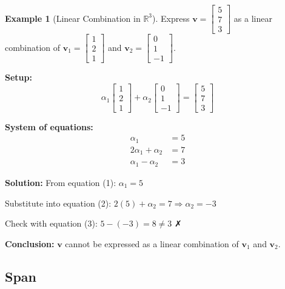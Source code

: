 \documentclass[12pt,a4paper]{article}
\theoremstyle{definition}
\newtheorem{example}{Example}[section]
\begin{document}
\begin{example}[Linear Combination in $\mathbb{R}^3$]
Express $\mathbf{v} = \begin{bmatrix} 5 \\ 7 \\ 3 \end{bmatrix}$ as a linear combination of $\mathbf{v}_1 = \begin{bmatrix} 1 \\ 2 \\ 1 \end{bmatrix}$ and $\mathbf{v}_2 = \begin{bmatrix} 0 \\ 1 \\ -1 \end{bmatrix}$.

\textbf{Setup:}
\begin{equation}
\alpha_1 \begin{bmatrix} 1 \\ 2 \\ 1 \end{bmatrix} + \alpha_2 \begin{bmatrix} 0 \\ 1 \\ -1 \end{bmatrix} = \begin{bmatrix} 5 \\ 7 \\ 3 \end{bmatrix}
\end{equation}

\textbf{System of equations:}
\begin{align}
\alpha_1 &= 5 \\
2\alpha_1 + \alpha_2 &= 7 \\
\alpha_1 - \alpha_2 &= 3
\end{align}

\textbf{Solution:}
From equation (1): $\alpha_1 = 5$

Substitute into equation (2): $2(5) + \alpha_2 = 7 \Rightarrow \alpha_2 = -3$

Check with equation (3): $5 - (-3) = 8 \neq 3$ ✗

\textbf{Conclusion:} $\mathbf{v}$ cannot be expressed as a linear combination of $\mathbf{v}_1$ and $\mathbf{v}_2$.
\end{example}

\subsection{Span}
\end{document}
